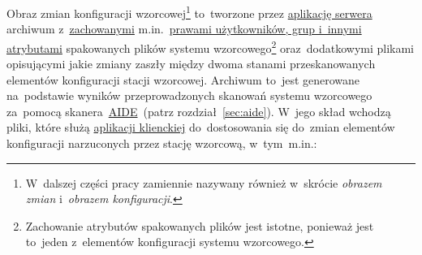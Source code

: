 \documentclass[thesis]{subfiles}
\begin{document}
Obraz zmian konfiguracji wzorcowej\footnote{W~dalszej części pracy zamiennie nazywany również w~skrócie \emph{obrazem zmian} i~\emph{obrazem konfiguracji}.} to~tworzone przez \hyperref[sec:srv-app]{aplikację serwera} archiwum \targz{} z~\href{https://unix.stackexchange.com/questions/43605/how-do-i-copy-a-folder-keeping-owners-and-permissions-intact}{zachowanymi} m.in.~\href{https://wiki.archlinux.org/index.php/File_permissions_and_attributes}{prawami użytkowników, grup i~innymi atrybutami} spakowanych plików systemu wzorcowego\footnote{Zachowanie atrybutów spakowanych plików jest istotne, ponieważ jest to~jeden z~elementów konfiguracji systemu wzorcowego.} oraz~dodatkowymi plikami opisującymi jakie zmiany zaszły między dwoma stanami przeskanowanych elementów konfiguracji stacji wzorcowej. Archiwum to~jest generowane na~podstawie wyników przeprowadzonych skanowań systemu wzorcowego za~pomocą skanera~\hyperref[sec:aide]{AIDE}~(patrz rozdział~\ref{sec:aide}). W~jego skład wchodzą pliki, które służą \hyperref[sec:cli-app]{aplikacji klienckiej} do~dostosowania się do~zmian elementów konfiguracji narzuconych przez stację wzorcową, w~tym~m.in.:\mynobreakpar
\end{document}
